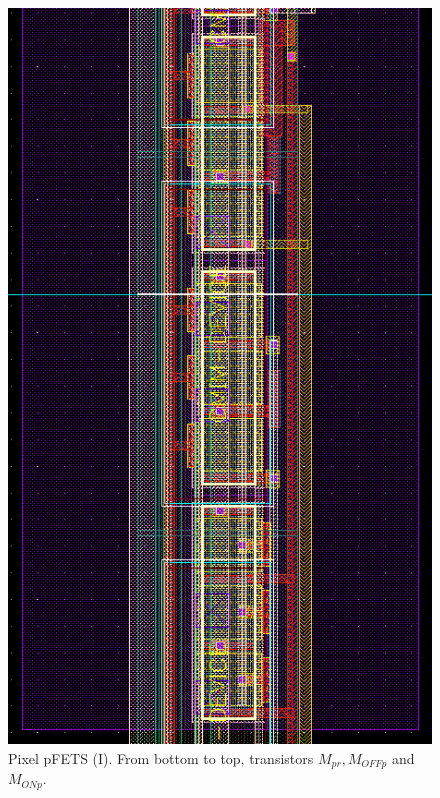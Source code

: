 \begin{figure}
	\center
	\includegraphics{pixel2.png}
	\caption{Pixel pFETS (I). From bottom to top, transistors $M_{pr}, M_{OFFp}$ and $M_{ONp}$.}
	\label{dos}
\end{figure}

